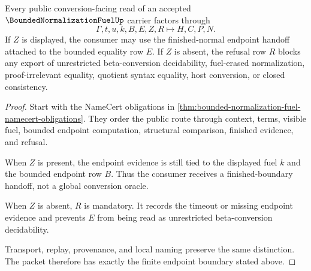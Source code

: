 \begin{theorem}
\label{thm:bounded-normalization-fuel-finished-boundary}
Every public conversion-facing read of an accepted $\BoundedNormalizationFuelUp$ carrier factors through
$$
\Gamma,t,u,k,B,E,Z,R \longmapsto H,C,P,N .
$$
If $Z$ is displayed, the consumer may use the finished-normal endpoint handoff attached to the bounded equality row $E$. If $Z$ is absent, the refusal row $R$ blocks any export of unrestricted beta-conversion decidability, fuel-erased normalization, proof-irrelevant equality, quotient syntax equality, host conversion, or closed consistency.
\end{theorem}
\begin{proof}
Start with the NameCert obligations in \autoref{thm:bounded-normalization-fuel-namecert-obligations}. They order the public route through context, terms, visible fuel, bounded endpoint computation, structural comparison, finished evidence, and refusal.

When $Z$ is present, the endpoint evidence is still tied to the displayed fuel $k$ and the bounded endpoint row $B$. Thus the consumer receives a finished-boundary handoff, not a global conversion oracle.

When $Z$ is absent, $R$ is mandatory. It records the timeout or missing endpoint evidence and prevents $E$ from being read as unrestricted beta-conversion decidability.

Transport, replay, provenance, and local naming preserve the same distinction. The packet therefore has exactly the finite endpoint boundary stated above.
\end{proof}

